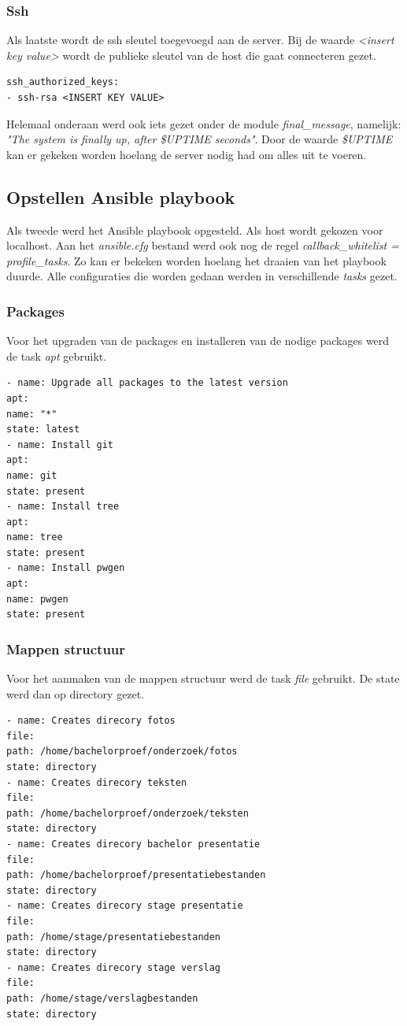\subsubsection{Ssh}
Als laatste wordt de ssh sleutel toegevoegd aan de server. Bij de waarde \textit{<insert key value>} wordt de publieke sleutel van de host die gaat connecteren gezet.
\begin{lstlisting}[basicstyle=\small]
ssh_authorized_keys:
- ssh-rsa <INSERT KEY VALUE>
\end{lstlisting}

Helemaal onderaan werd ook iets gezet onder de module \textit{final\_message}, namelijk: \textit{"The system is finally up, after \$UPTIME seconds"}. Door de waarde \textit{\$UPTIME} kan er gekeken worden hoelang de server nodig had om alles uit te voeren.

\subsection{Opstellen Ansible playbook}
Als tweede werd het Ansible playbook opgesteld. Als host wordt gekozen voor localhost. Aan het \textit{ansible.cfg} bestand werd ook nog de regel \textit{callback\_whitelist = profile\_tasks}. Zo kan er bekeken worden hoelang het draaien van het playbook duurde. Alle configuraties die worden gedaan werden in verschillende \textit{tasks} gezet. 

\subsubsection{Packages}
Voor het upgraden van de packages en installeren van de nodige packages werd de task \textit{apt} gebruikt.
\begin{lstlisting}[basicstyle=\small]
- name: Upgrade all packages to the latest version
apt:
name: "*"
state: latest
- name: Install git
apt:
name: git
state: present
- name: Install tree
apt:
name: tree
state: present
- name: Install pwgen
apt:
name: pwgen
state: present
\end{lstlisting}
\subsubsection{Mappen structuur}
Voor het aanmaken van de mappen structuur werd de task \textit{file} gebruikt. De state werd dan op directory gezet.
\begin{lstlisting}[basicstyle=\small]
- name: Creates direcory fotos
file:
path: /home/bachelorproef/onderzoek/fotos
state: directory
- name: Creates direcory teksten
file:
path: /home/bachelorproef/onderzoek/teksten
state: directory
- name: Creates direcory bachelor presentatie
file:
path: /home/bachelorproef/presentatiebestanden
state: directory
- name: Creates direcory stage presentatie
file:
path: /home/stage/presentatiebestanden
state: directory
- name: Creates direcory stage verslag
file:
path: /home/stage/verslagbestanden
state: directory
\end{lstlisting}
